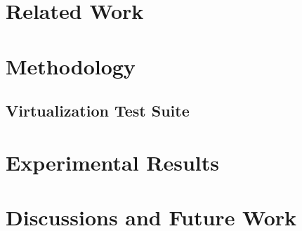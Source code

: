 \documentclass[12pt,onecolumn,oneside]{article}
\begin{document}
\section{Related Work}


\newpage

\section{Methodology}

\subsection{Virtualization Test Suite}

\newpage


\section{Experimental Results}

\newpage

\section{Discussions and Future Work}

\newpage


\end{document}
